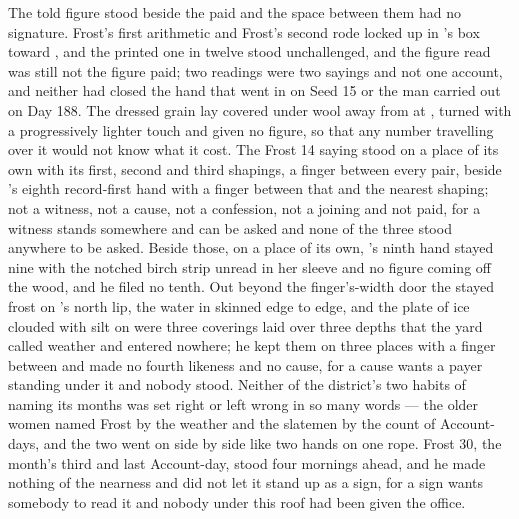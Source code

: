 The told figure stood beside the paid and the space between them had no signature. Frost's first arithmetic and Frost's second rode locked up  in 's box toward , and the printed one in twelve stood unchallenged, and the figure read was still not the figure paid; two readings were two sayings and not one account, and neither had closed the hand that went in on Seed 15 or the man carried out on Day 188. The dressed grain lay covered under wool away from  at , turned with a progressively lighter touch and given no figure, so that any number travelling over it would not know what it cost. The Frost 14 saying stood on a place of its own with its first, second and third shapings, a finger between every pair, beside 's eighth record-first hand with a finger between that and the nearest shaping; not a witness, not a cause, not a confession, not a joining and not paid, for a witness stands somewhere and can be asked and none of the three stood anywhere to be asked. Beside those, on a place of its own, 's ninth hand stayed nine with the notched birch strip unread in her sleeve and no figure coming off the wood, and he filed no tenth. Out beyond the finger's-width door the stayed frost on 's north lip, the water in  skinned edge to edge, and the plate of ice clouded with silt on  were three coverings laid over three depths that the yard called weather and entered nowhere; he kept them on three places with a finger between and made no fourth likeness and no cause, for a cause wants a payer standing under it and nobody stood. Neither of the district's two habits of naming its months was set right or left wrong in so many words --- the older women named Frost by the weather and the slatemen by the count of Account-days, and the two went on side by side like two hands on one rope. Frost 30, the month's third and last Account-day, stood four mornings ahead, and he made nothing of the nearness and did not let it stand up as a sign, for a sign wants somebody to read it and nobody under this roof had been given the office.

\scenebreak

